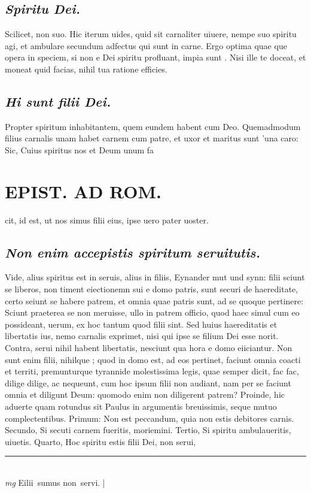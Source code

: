 \documentclass{article}
\begin{document}
\begin{pages}
\subsection*{\textit{Spiritu Dei. }}\pstart Scilicet, non suo. Hic iterum uides, quid sit carnaliter uiuere, nempe suo spiritu agi, et ambulare secundum adfectus qui sunt in carne. Ergo optima quae que opera in speciem, si non e Dei spiritu profluant, impia sunt . Nisi ille te doceat, et moneat quid facias, nihil tua ratione efficies.   \pend
{}
{}
\subsection*{\textit{Hi sunt filii Dei. }}\pstart Propter spiritum inhabitantem, quem eundem habent cum Deo. Quemadmodum filius carnalis unam habet carnem cum patre, et uxor et maritus sunt 'una caro: Sic, Cuius spiritus nos et Deum unum fa\pend
\section*{EPIST. AD ROM.  }
\marginpar{[ p. ]}\pstart cit, id est, ut nos simus filii eius, ipse uero pater uoster.  \pend
{}
{}
\subsection*{\textit{Non enim accepistis spiritum seruitutis. }}\pstart Vide, alius spiritus est in seruis, alius in filiis, Eynander mut und synn: filii sciunt se liberos, non timent eiectionemn sui e domo patris, sunt securi de haereditate, certo seiunt se habere patrem, et omnia quae patris sunt, ad se quoque pertinere: Sciunt praeterea se non meruisse, ullo in patrem officio, quod haec simul cum eo possideant, uerum, ex hoc tantum quod filii sint.  Sed huius haereditatis et libertatis ius, nemo carnalis exprimet, nisi qui ipse se filium Dei esse norit.  Contra, serui nihil habent libertatis, nesciunt qua hora e domo eiiciantur. Non sunt enim filii, nihilque ; quod in domo est, ad eos pertinet, faciunt omnia coacti et territi, premunturque tyrannide molestissima legis, quae semper dicit, fac fac, dilige dilige, ac nequeunt, cum hoc ipsum filii non audiant, nam per se faciunt omnia et diligunt Deum: quomodo enim non diligerent patrem? Proinde, hic aduerte quam rotundus sit Paulus in argumentis breuissimis, seque mutuo complectentibus. Primum: Non est peccandum, quia non estis debitores carnis. Secundo, Si secuti carnem fueritis, moriemini. Tertio, Si spiritu ambulaueritis, uiuetis. Quarto, Hoc spiritu estis filii Dei, non serui,  \pend
\vspace{0.5cm}\noindent
\vspace{0.2cm}\rule{1cm}{0.2pt}\\ 
\hspace{0.2cm}\textit{mg}
\footnotesize Eilii sumus non servi. 
\normalsize| 

\end{pages}
\end{document}
